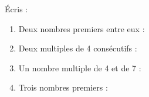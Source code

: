 %
%
    Écris :
    \begin{enumerate}[itemsep=1em]
        \item Deux nombres premiers entre eux :
        \item Deux multiples de 4 consécutifs :
        \item Un nombre multiple de 4 et de 7 :
        \item Trois nombres premiers :
    \end{enumerate}
